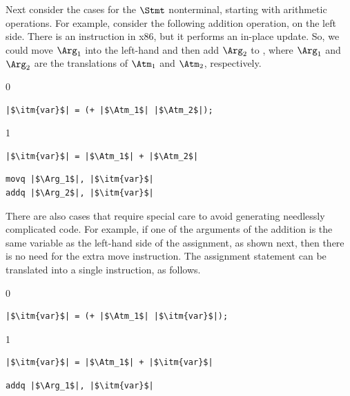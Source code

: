 \documentclass[7x10]{TimesAPriori_MIT}%
\def\racketEd{0}
\def\pythonEd{1}
\def\edition{0}
\numberwithin{theorem}{chapter}
\numberwithin{definition}{chapter}
\numberwithin{equation}{chapter}
\begin{document}
Next consider the cases for the $\Stmt$ nonterminal, starting with
arithmetic operations. For example, consider the following addition
operation, on the left side. There is an  instruction in
x86, but it performs an in-place update.  So, we could move $\Arg_1$
into the left-hand  and then add $\Arg_2$ to ,
where $\Arg_1$ and $\Arg_2$ are the translations of $\Atm_1$ and
$\Atm_2$, respectively.
\begin{transformation}
{\if\edition\racketEd    
\begin{lstlisting}
|$\itm{var}$| = (+ |$\Atm_1$| |$\Atm_2$|);
\end{lstlisting}
\fi}
{\if\edition\pythonEd
\begin{lstlisting}
|$\itm{var}$| = |$\Atm_1$| + |$\Atm_2$|
\end{lstlisting}
\fi}
\compilesto
\begin{lstlisting}
movq |$\Arg_1$|, |$\itm{var}$|
addq |$\Arg_2$|, |$\itm{var}$|
\end{lstlisting}
\end{transformation}
There are also cases that require special care to avoid generating
needlessly complicated code. For example, if one of the arguments of
the addition is the same variable as the left-hand side of the
assignment, as shown next, then there is no need for the extra move
instruction.  The assignment statement can be translated into a single
 instruction, as follows.
\begin{transformation}
{\if\edition\racketEd
\begin{lstlisting}
|$\itm{var}$| = (+ |$\Atm_1$| |$\itm{var}$|);
\end{lstlisting}
\fi}
{\if\edition\pythonEd
\begin{lstlisting}
|$\itm{var}$| = |$\Atm_1$| + |$\itm{var}$|
\end{lstlisting}
\fi}    
\compilesto
\begin{lstlisting}
addq |$\Arg_1$|, |$\itm{var}$|
\end{lstlisting}
\end{transformation}
\end{document}

